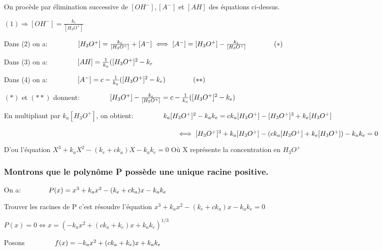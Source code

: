 \documentclass[11pt]{article}
\begin{document}
    On procède par élimination successive de \([OH^-], [A^-]\) et \([AH]\)
des équations ci-dessus.

\((1)\Rightarrow[OH^-]=\frac{k_e}{[H_3O^+]}\)

Dans (2) on a:
\(\hspace{40px}[H_3O^+]=\frac{k_e}{[H_3O^+]}+[A^-] \iff[A^-]=[H_3O^+]-\frac{k_e}{[H_3O^+]} \hspace{40px}(*)\)

Dans (3) on a: \(\hspace{40px}[AH]=\frac{1}{k_a}([H_3O^+]^2-k_e\)

Dans (4) on a:
\(\hspace{40px}[A^-]=c-\frac{1}{k_a}([H_3O^+]^2-k_e)\hspace{40px}(**)\)

\((*)\) et \((**)\) donnent:
\(\hspace{40px}[H_3O^+]-\frac{k_e}{[H_3O^+]}=c-\frac{1}{k_a}([H_3O^+]^2-k_e)\)

En multipliant par \(k_a[H_3O^+]\), on obtient:
\(\hspace{40px}k_a[H_3O^+]^2-k_ak_e = ck_a[H_3O^+]-[H_3O^+]^3+k_e[H_3O^+]\)

\(\hspace{250px}\iff [H_3O^+]^3+k_a[H_3O^+]-(ck_a[H_3O^+]+k_e[H_3O^+])-k_ak_e=0\)

D'ou l'équation \(X^3+k_aX^2-(k_e+ck_a)X-k_ak_e=0\) Où X représente la
concentration en \(H_3O^+\)

    \hypertarget{montrons-que-le-polynuxf4me-p-possuxe8de-une-unique-racine-positive.}{%
\subsubsection{\texorpdfstring{\textbf{Montrons que le polynôme P
possède une unique racine
positive.}}{Montrons que le polynôme P possède une unique racine positive.}}\label{montrons-que-le-polynuxf4me-p-possuxe8de-une-unique-racine-positive.}}

On a:\(\hspace{40px}P(x) = x^3+k_ax^2-(k_e+ck_a)x-k_ak_e\)

Trouver les racines de P c'est résoudre l'équation
\(x^3+k_ax^2-(k_e+ck_a)x-k_ak_e=0\)

\(P(x)=0 \iff x=(-k_ax^2+(ck_a+k_e)x+k_ak_e)^{1/3}\)

Posons \(\hspace{40px}f(x)=-k_ax^2+(ck_a+k_e)x+k_ak_e\)
\end{document}
